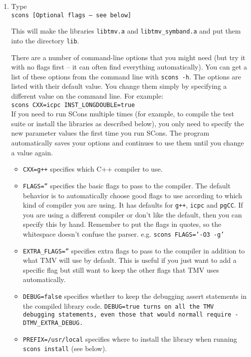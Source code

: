 \begin{enumerate}

\item Type \\
\texttt{scons [Optional flags -- see below]}

This will make the libraries \texttt{libtmv.a} and \texttt{libtmv\_symband.a}
and put them into the directory \texttt{lib}. 

There are a number of command-line options that you might need (but try it with no flags first -- it can often find everything automatically).  
You can get a list of these options from the command line with \texttt{scons -h}.  The options are listed with their default value.  You change them simply by specifying a different value on the command line.  For example:\\
\texttt{scons CXX=icpc INST\_LONGDOUBLE=true}\\
If you need to run SCons multiple times (for example, to compile the test suite or install the libraries as described below), you only need to specify the new parameter values the first time you run SCons.  The program automatically saves your options and continues to use them until you change a value again.
\begin{itemize}
\item \texttt{CXX=g++} specifies which C++ compiler to use.
\item \texttt{FLAGS=''} specifies the basic flags to pass to the compiler.  The default behavior is to
automatically choose good flags to use according to which kind of compiler you are using.
It has defaults for \texttt{g++}, \texttt{icpc} and \texttt{pgCC}.  If you are using a different compiler or don't
like the default, then you can specify this by hand.  
Remember to put the flags in quotes,
so the whitespace doesn't confuse the parser.  e.g. \texttt{scons FLAGS='-O3 -g'}
\item \texttt{EXTRA\_FLAGS=''} specifies extra flags to pass to the compiler in addition to what TMV will use by default.  This is useful if you just want to add a specific flag but still want to keep the other flags that TMV uses automatically.
\item \texttt{DEBUG=false} specifies whether to keep the debugging assert statements in the compiled library code.  \tt{DEBUG=true} turns on all the TMV debugging statements, even those that would normall require \tt{-DTMV\_EXTRA\_DEBUG}.
\item \texttt{PREFIX=/usr/local} specifies where to install the library when running \texttt{scons install} (see below).

\end{itemize}
\end{enumerate}
